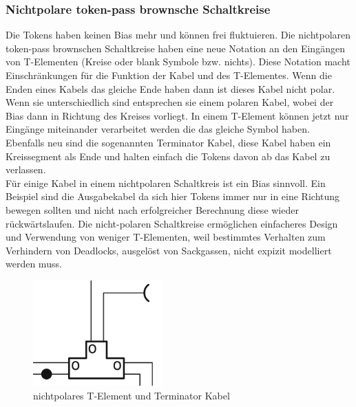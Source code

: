 \documentclass[11pt,a4paper]{article}
\begin{document}

\subsubsection{Nichtpolare token-pass brownsche Schaltkreise}
Die Tokens haben keinen Bias mehr und können frei fluktuieren.
%
Die nichtpolaren token-pass brownschen Schaltkreise haben eine neue Notation
an den Eingängen von T-Elementen (Kreise oder blank Symbole bzw. nichts).
%
Diese Notation macht Einschränkungen für die Funktion
der Kabel und des T-Elementes.
%
Wenn die Enden eines Kabels das gleiche Ende haben dann ist dieses Kabel nicht
polar. 
%
Wenn sie unterschiedlich sind entsprechen sie einem polaren Kabel, wobei 
der Bias dann in Richtung des Kreises vorliegt.
%
In einem T-Element können jetzt nur Eingänge miteinander verarbeitet werden
die das gleiche Symbol haben. \\
%
Ebenfalls neu sind die sogenannten Terminator Kabel, diese Kabel haben ein 
Kreissegment als Ende und halten einfach die Tokens 
davon ab das Kabel zu verlassen. \\
%
Für einige Kabel in einem nichtpolaren Schaltkreis ist ein Bias sinnvoll.
%
Ein Beispiel sind die Ausgabekabel da sich hier Tokens immer nur in eine 
Richtung bewegen sollten und nicht nach erfolgreicher Berechnung diese 
wieder rückwärtslaufen.
%
Die nicht-polaren Schaltkreise ermöglichen einfacheres Design und Verwendung
von weniger T-Elementen, weil bestimmtes Verhalten zum Verhindern von
Deadlocks, ausgelöst von Sackgassen, nicht expizit modelliert werden muss.

\begin{figure}[h]
    \centering
    \includegraphics[width=5cm]{bilder/NonPolarTerminator.png}
    \caption{nichtpolares T-Element und Terminator Kabel}
    \label{fig:T_Element}
\end{figure}


\end{document}
